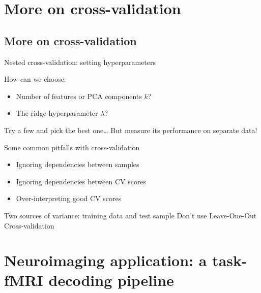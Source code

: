 \documentclass[presentation,mathserif,table]{beamer}
\begin{document}
\section{More on cross-validation}
\label{sec:orge27c722}
\subsection{More on cross-validation}
\label{sec:org14da6f6}


\begin{frame}[label={sec:org611dcc4}]{Nested cross-validation: setting hyperparameters}
\begin{block}{How can we choose:}
\begin{itemize}
\item Number of features or PCA components \(k\)?
\item The ridge hyperparameter \(\lambda\)?
\end{itemize}

Try a few and pick the best one\ldots{}
But measure its performance on separate data!
\end{block}
\end{frame}
\begin{frame}[label={sec:org4d642ae}]{Some common pitfalls with cross-validation}
\begin{itemize}
\item Ignoring dependencies between samples
\item Ignoring dependencies between CV scores
\item Over-interpreting good CV scores
\end{itemize}
\end{frame}

\begin{frame}[label={sec:org1aa26ac}]{Two sources of variance: training data and test sample}
Don't use Leave-One-Out Cross-validation
\end{frame}
\section{Neuroimaging application: a task-fMRI decoding pipeline}
\label{sec:orgd5c9ab5}
\end{document}

